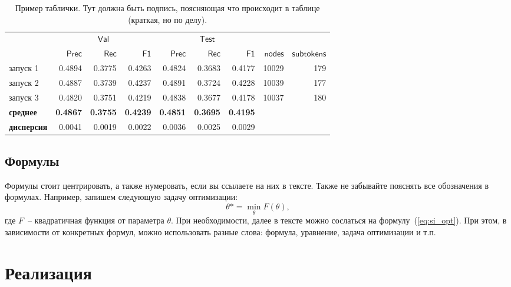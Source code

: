 \documentclass[a4paper,12pt]{extarticle}
\begin{document}
\begin{table}[ht]
	\caption{Пример таблички. Тут должна быть подпись, поясняющая что происходит в таблице (краткая, но по делу).}
	\label{table:long_epochs}
	\footnotesize
	\centering
	\begin{tabular}{lrrrrrrrr}
		\toprule
		& \multicolumn{3}{c}{$\mathsf{Val}$} &
		\multicolumn{3}{c}{$\mathsf{Test}$} \\
		\cmidrule(lr){2-4} \cmidrule(l){5-7} 
		{} &  $\mathsf{Prec}$ &  $\mathsf{Rec}$ &  $\mathsf{F1}$ &  $\mathsf{Prec}$ &  $\mathsf{Rec}$ &  $\mathsf{F1}$  &  $\mathsf{nodes}$ & $\mathsf{subtokens}$\\
		\midrule
		запуск 1    &    0.4894 &   0.3775 &  0.4263 &     0.4824 &    0.3683 &   0.4177 & 10029 & 179\\
		запуск 2    &    0.4887 &   0.3739 &  0.4237 &     0.4891 &    0.3724 &   0.4228 & 10039 & 177\\
		запуск 3    &    0.4820 &   0.3751 &  0.4219 &     0.4838 &    0.3677 &   0.4178 & 10037&	180\\
		\midrule
		\bf{среднее} &    \bf{0.4867} &   \bf{0.3755} &  \bf{0.4239} &    \bf{ 0.4851} &    \bf{0.3695} &   \bf{0.4195} \\
		\bf{дисперсия}  &    0.0041 &   0.0019 &  0.0022 &     0.0036 &    0.0025 &   0.0029 \\
		\bottomrule
	\end{tabular}
\end{table}

\subsection{Формулы}

Формулы стоит центрировать, а также нумеровать, если вы ссылаете на них в тексте. Также не забывайте пояснять все обозначения в формулах. Например, запишем следующую задачу оптимизации:
\begin{equation}
    \label{eq:si_opt}
        \theta* = \min_{\theta} F(\theta),
\end{equation}
где $F$~-- квадратичная функция от параметра $\theta$. При необходимости, далее в тексте можно сослаться на формулу~(\ref{eq:si_opt}). При этом, в зависимости от конкретных формул, можно использовать разные слова: формула, уравнение, задача оптимизации и т.п.


\section*{Реализация}
\end{document}
